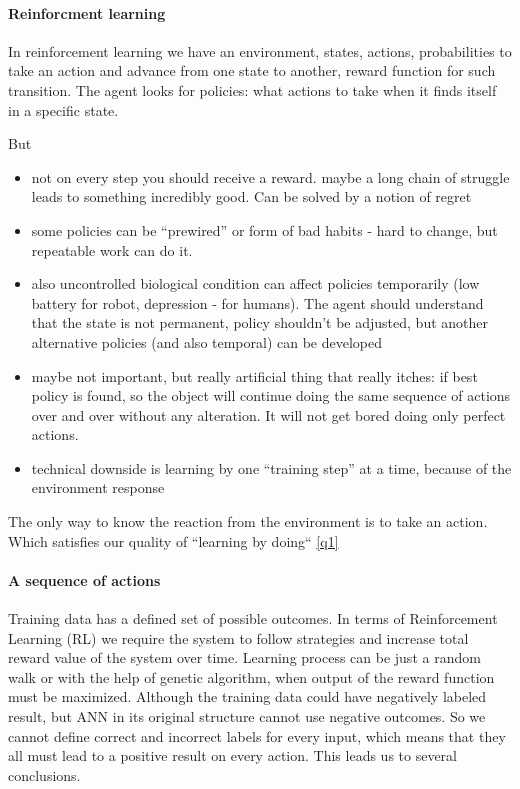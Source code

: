 \documentclass{article}
\begin{document}
\paragraph{Reinforcment learning}
In reinforcement learning we have an environment, states, actions, probabilities to take an action and advance from one state to another, reward function for such transition. The agent looks for policies: what actions to take when it finds itself in a specific state.

But

\begin{itemize}
\item  not on every step you should receive a reward. maybe a long chain of struggle leads to something incredibly good. Can be solved by a notion of regret
\item some policies can be “prewired” or form of bad habits - hard to change, but repeatable work can do it.
\item also uncontrolled biological condition can affect policies temporarily (low battery for robot, depression - for humans). The agent should understand that the state is not permanent, policy shouldn’t be adjusted, but another alternative policies (and also temporal) can be developed
\item maybe not important, but really artificial thing that really itches: if best policy is found, so the object will continue doing the same sequence of actions over and over without any alteration. It will not get bored doing only perfect actions.
\item technical downside is learning by one “training step” at a time, because of the environment response
\end{itemize}

The only way to know the reaction from the environment is to take an action. Which satisfies our quality of “learning by doing“ \ref{q1}

\paragraph{A sequence of actions}
Training data has a defined set of possible outcomes. In terms of Reinforcement Learning (RL) we require the system to follow strategies and increase total reward value of the system over time.
Learning process can be just a random walk or with the help of genetic algorithm, when output of the reward function must be maximized.
Although the training data could have negatively labeled result, but ANN in its original structure cannot use negative outcomes. So we cannot define correct and incorrect labels for every input, which means that they all must lead to a positive result on every action. This leads us to several conclusions. 
\end{document}
